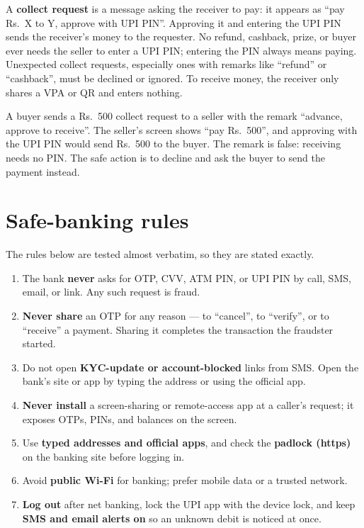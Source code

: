A \textbf{collect request} is a message asking the receiver to pay: it
appears as ``pay Rs.\ X to Y, approve with UPI PIN''. Approving it and
entering the UPI PIN sends the receiver's money to the requester. No refund,
cashback, prize, or buyer ever needs the seller to enter a UPI PIN; entering
the PIN always means paying. Unexpected collect requests, especially ones
with remarks like ``refund'' or ``cashback'', must be declined or ignored.
To receive money, the receiver only shares a VPA or QR and enters nothing.

\begin{example}
A buyer sends a Rs.\ 500 collect request to a seller with the remark
``advance, approve to receive''. The seller's screen shows ``pay Rs.\ 500'',
and approving with the UPI PIN would send Rs.\ 500 to the buyer. The remark
is false: receiving needs no PIN. The safe action is to decline and ask the
buyer to send the payment instead.
\end{example}

\section{Safe-banking rules}
The rules below are tested almost verbatim, so they are stated exactly.

\begin{enumerate}
  \item The bank \textbf{never} asks for OTP, CVV, ATM PIN, or UPI PIN by
    call, SMS, email, or link. Any such request is fraud.
  \item \textbf{Never share} an OTP for any reason --- to ``cancel'', to
    ``verify'', or to ``receive'' a payment. Sharing it completes the
    transaction the fraudster started.
  \item Do not open \textbf{KYC-update or account-blocked} links from SMS.
    Open the bank's site or app by typing the address or using the official
    app.
  \item \textbf{Never install} a screen-sharing or remote-access app at a
    caller's request; it exposes OTPs, PINs, and balances on the screen.
  \item Use \textbf{typed addresses and official apps}, and check the
    \textbf{padlock (https)} on the banking site before logging in.
  \item Avoid \textbf{public Wi-Fi} for banking; prefer mobile data or a
    trusted network.
  \item \textbf{Log out} after net banking, lock the UPI app with the device
    lock, and keep \textbf{SMS and email alerts on} so an unknown debit is
    noticed at once.
\end{enumerate}

